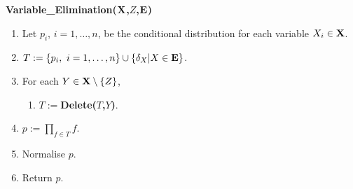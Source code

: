 \bigskip\noindent
\textsf{\textbf{Variable\_Elimination($\mathbf{X}$,$Z$,$\mathbf{E}$)}}

\begin{enumerate}
  \item Let $p_i$, $i=1,\ldots,n$, be the conditional distribution
  for each variable $X_i\in \mathbf{X}$.
  \item $T:=\{ p_i, ~ i=1,\ldots,n\} \cup \{ \delta_X | X\in\mathbf{E}\}$.
  \item For each $Y\in\mathbf{X}\setminus\{ Z\}$,
\begin{enumerate}
  \item[] $T:=$\textsf{\textbf{Delete($T$,$Y$)}}.
\end{enumerate}
  \item $p:=\prod_{f\in T} f$.
  \item Normalise $p$.
  \item Return $p$.
\end{enumerate}
